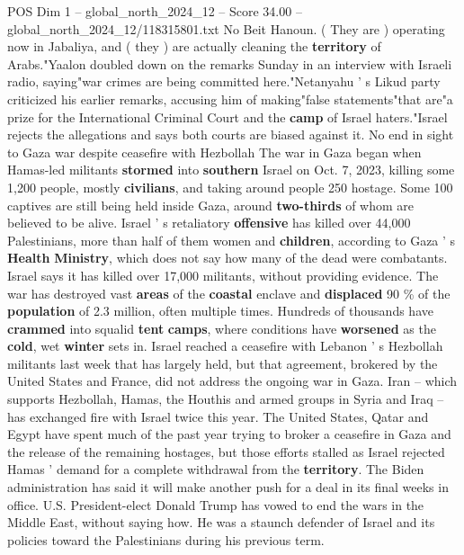\begin{textsample}{POS Dim 1 – global\_north\_2024\_12 – Score 34.00 – global\_north\_2024\_12/118315801.txt}
No Beit Hanoun. ( They are ) operating now in Jabaliya, and ( they ) are actually cleaning the \textbf{territory} of Arabs."Yaalon doubled down on the remarks Sunday in an interview with Israeli radio, saying"war crimes are being committed here."Netanyahu ' s Likud party criticized his earlier remarks, accusing him of making"false statements"that are"a prize for the International Criminal Court and the \textbf{camp} of Israel haters."Israel rejects the allegations and says both courts are biased against it.
No end in sight to Gaza war despite ceasefire with Hezbollah The war in Gaza began when Hamas-led militants \textbf{stormed} into \textbf{southern} Israel on Oct. 7, 2023, killing some 1,200 people, mostly \textbf{civilians}, and taking around people 250 hostage.
Some 100 captives are still being held inside Gaza, around \textbf{two-thirds} of whom are believed to be alive.
Israel ' s retaliatory \textbf{offensive} has killed over 44,000 Palestinians, more than half of them women and \textbf{children}, according to Gaza ' s \textbf{Health} \textbf{Ministry}, which does not say how many of the dead were combatants.
Israel says it has killed over 17,000 militants, without providing evidence.
The war has destroyed vast \textbf{areas} of the \textbf{coastal} enclave and \textbf{displaced} 90 \% of the \textbf{population} of 2.3 million, often multiple times.
Hundreds of thousands have \textbf{crammed} into squalid \textbf{tent} \textbf{camps}, where conditions have \textbf{worsened} as the \textbf{cold}, wet \textbf{winter} sets in.
Israel reached a ceasefire with Lebanon ' s Hezbollah militants last week that has largely held, but that agreement, brokered by the United States and France, did not address the ongoing war in Gaza.
Iran -- which supports Hezbollah, Hamas, the Houthis and armed groups in Syria and Iraq -- has exchanged fire with Israel twice this year.
The United States, Qatar and Egypt have spent much of the past year trying to broker a ceasefire in Gaza and the release of the remaining hostages, but those efforts stalled as Israel rejected Hamas ' demand for a complete withdrawal from the \textbf{territory}.
The Biden administration has said it will make another push for a deal in its final weeks in office.
U.S.
President-elect Donald Trump has vowed to end the wars in the Middle East, without saying how.
He was a staunch defender of Israel and its policies toward the Palestinians during his previous term.

\end{textsample}
